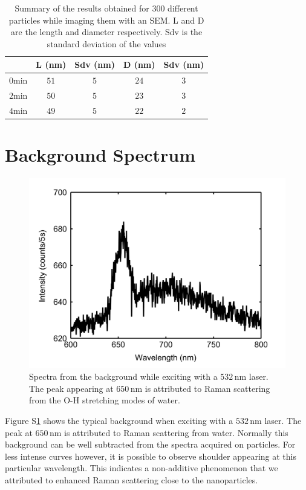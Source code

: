 \documentclass[journal=nalefd,manuscript=letter]{achemso}
\newcommand{\nm}{\ensuremath{\,\textrm{nm}}}
\begin{document}
\begin{table}[htp]
\begin{tabular*}{0.48\textwidth}{c c c c c}
 $\,$ & L (nm) & Sdv (nm) & D (nm) & Sdv (nm) \\\hline
 $0\textrm{min}$ & $51$ & $5$ & $24$ & $3$ \\
 $2\textrm{min}$ & $50$ & $5$ & $23$ & $3$ \\
 $4\textrm{min}$ & $49$ & $5$ & $22$ & $2$ \\
\end{tabular*}
\label{tab:SEM_results}
\caption{Summary of the results obtained for 300 different particles while
imaging them with an SEM. L and D are the length and diameter respectively.
Sdv is the standard deviation of the values}
\end{table}

\section{Background Spectrum}
\begin{figure}[htp]
 \centering
 \includegraphics[width=0.95\linewidth]{Figures/04_Supporting/03_Background/background.png}
 \caption{Spectra from the background while exciting with a $532\nm$ laser. The
 peak appearing at $650\nm$ is attributed to Raman scattering from the O-H stretching modes of water.}
 \label{fig:Background}
\end{figure}

Figure S\ref{fig:Background} shows the typical background when exciting with a
$532\nm$ laser. The peak at $650\nm$ is attributed to Raman scattering from
water. Normally this background can be well subtracted from the spectra acquired
on particles. For less intense curves however, it is possible to observe
shoulder appearing at this particular wavelength. This indicates a non-additive 
phenomenon that we attributed to enhanced Raman scattering close to the nanoparticles.
\end{document}
